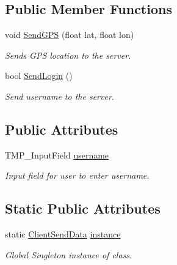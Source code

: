 \subsection*{Public Member Functions}
\begin{DoxyCompactItemize}
\item 
void \mbox{\hyperlink{class_client_send_data_aed0b71505a76cb58a2b0c58ad239748b}{Send\+G\+PS}} (float lat, float lon)
\begin{DoxyCompactList}\small\item\em Sends G\+PS location to the server. \end{DoxyCompactList}\item 
bool \mbox{\hyperlink{class_client_send_data_abea10903c98ebd507bbb48b80a7c1b6f}{Send\+Login}} ()
\begin{DoxyCompactList}\small\item\em Send username to the server. \end{DoxyCompactList}\end{DoxyCompactItemize}
\subsection*{Public Attributes}
\begin{DoxyCompactItemize}
\item 
T\+M\+P\+\_\+\+Input\+Field \mbox{\hyperlink{class_client_send_data_a849beae9051bf483a4dd446b74d50812}{username}}
\begin{DoxyCompactList}\small\item\em Input field for user to enter username. \end{DoxyCompactList}\end{DoxyCompactItemize}
\subsection*{Static Public Attributes}
\begin{DoxyCompactItemize}
\item 
static \mbox{\hyperlink{class_client_send_data}{Client\+Send\+Data}} \mbox{\hyperlink{class_client_send_data_acdad1498e2dc672310edae72ad9a655e}{instance}}
\begin{DoxyCompactList}\small\item\em Global Singleton instance of class. \end{DoxyCompactList}\end{DoxyCompactItemize}
